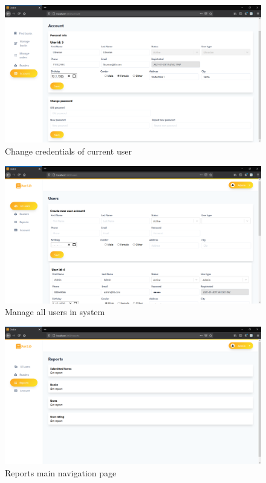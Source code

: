 \begin{figure}[H]
    \centering
    \includegraphics[width=\textwidth]{Include/Resources/FrontendScreens/React/librarianAccount.png}
    \caption{Change credentials of current user}
    \label{fig:ScreenshotGUIlibrarianAccount}
\end{figure}




\begin{figure}[H]
    \centering
    \includegraphics[width=\textwidth]{Include/Resources/FrontendScreens/React/adminUsers.png}
    \caption{Manage all users in system}
    \label{fig:ScreenshotGUIadminUsers}
\end{figure}




\begin{figure}[H]
    \centering
    \includegraphics[width=\textwidth]{Include/Resources/FrontendScreens/React/adminReports.png}
    \caption{Reports main navigation page}
    \label{fig:ScreenshotGUIadminReports}
\end{figure}




